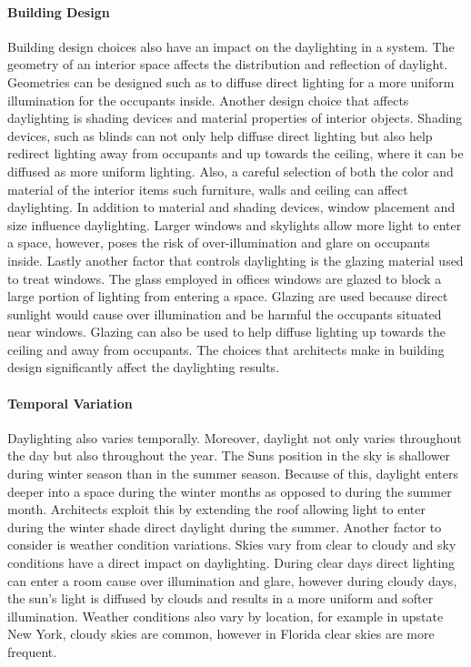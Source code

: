 		\paragraph{Building Design} Building design choices also have an impact on the daylighting in a system.
		The geometry of an interior space affects the distribution and reflection of daylight.
		Geometries can be designed such as to diffuse direct lighting for a more uniform illumination for the occupants inside.
		Another design choice that affects daylighting is shading devices and material properties of interior objects.
		Shading devices, such as blinds can not only help diffuse direct lighting but also help redirect lighting away from occupants and up towards the ceiling, where it can be diffused as more uniform lighting.
		Also, a careful selection of both the color and material of the interior items such furniture, walls and ceiling can affect daylighting.
		In addition to material and shading devices, window placement and size influence daylighting.
		Larger windows and skylights allow more light to enter a space, however, poses the risk of over-illumination and glare on occupants inside.
		Lastly another factor that controls daylighting is the glazing material used to treat windows.
		The glass employed in offices windows are glazed to block a large portion of lighting from entering a space.
		Glazing are used because direct sunlight would cause over illumination and be harmful the occupants situated near windows.
		Glazing can also be used to help diffuse lighting up towards the ceiling and away from occupants.
		The choices that architects make in building design significantly affect the daylighting results.\\

		\paragraph{Temporal Variation} Daylighting also varies temporally.
		Moreover, daylight not only varies throughout the day but also throughout the year.
		The Suns position in the sky is shallower during winter season than in the summer season. Because of this, daylight enters deeper into a space during the winter months as opposed to during the summer month.
		Architects exploit this by extending the roof allowing light to enter during the winter shade direct daylight during the summer.
		Another factor to consider is weather condition variations. Skies vary from clear to cloudy and sky conditions have a direct impact on daylighting. During clear days direct lighting can enter a room cause over illumination and glare, however during cloudy days, the sun's light is diffused by clouds and results in a more uniform and softer illumination.
		Weather conditions also vary by location, for example in upstate New York, cloudy skies are common, however in Florida clear skies are more frequent.\\

